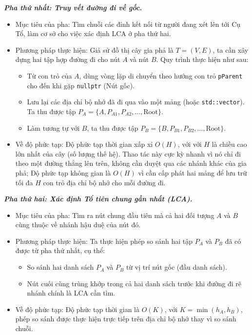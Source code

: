 \textbf{\textit{Pha thứ nhất: Truy vết đường đi về gốc.}}
\begin{itemize}
    \item Mục tiêu của pha: Tìm chuỗi các đỉnh kết nối từ người đang xét lên tới Cụ Tổ, làm cơ sở cho việc xác định LCA ở pha thứ hai.
    \item Phương pháp thực hiện: Giả sử đồ thị cây gia phả là $T = (V, E)$, ta cần xây dựng hai tập hợp đường đi cho nút $A$ và nút $B$. Quy trình thực hiện như sau:
    \begin{itemize}
        \item Từ con trỏ của $A$, dùng vòng lặp di chuyển theo hướng con trỏ {\tt pParent} cho đến khi gặp {\tt nullptr} (Nút gốc).
        \item Lưu lại các địa chỉ bộ nhớ đã đi qua vào một mảng (hoặc \texttt{std::vector}). Ta thu được tập $P_A = \{A, P_{A1}, P_{A2}, \dots, \text{Root}\}$.
        \item Làm tương tự với $B$, ta thu được tập $P_B = \{B, P_{B1}, P_{B2}, \dots, \text{Root}\}$.
    \end{itemize}
    \item Về độ phức tạp: Độ phức tạp thời gian xấp xỉ $O(H)$, với với $H$ là chiều cao lớn nhất của cây (số lượng thế hệ). Thao tác này cực kỳ nhanh vì nó chỉ đi theo một đường thẳng lên trên, không cần duyệt qua các nhánh khác của gia phả; Độ phức tạp không gian là $O(H)$ vì cần cấp phát hai mảng để lưu trữ tối đa $H$ con trỏ địa chỉ bộ nhớ cho mỗi đường đi.
    \end{itemize}


\vspace*{-\baselineskip}
\textbf{\textit{Pha thứ hai: Xác định Tổ tiên chung gần nhất (LCA).}}
\begin{itemize}
    \item Mục tiêu của pha: Tìm ra nút chung đầu tiên mà cả hai đối tượng $A$ và $B$ cùng thuộc về nhánh hậu duệ của nút đó.
    \item Phương pháp thực hiện: Ta thực hiện phép so sánh hai tập $P_A$ và $P_B$ đã có được từ pha thứ nhất, cụ thể:
    \begin{itemize}
        \item So sánh hai danh sách $P_A$ và $P_B$ từ vị trí nút gốc (đầu danh sách).
        \item Nút cuối cùng trùng khớp trong cả hai danh sách trước khi đường đi rẽ nhánh chính là LCA cần tìm.
    \end{itemize}
    \item Về độ phức tạp: Độ phức tạp thời gian là $O(K)$, với $K = \min(h_A, h_B)$, phép so sánh được thực hiện trực tiếp trên địa chỉ bộ nhớ thay vì so sánh chuỗi.
\end{itemize}

